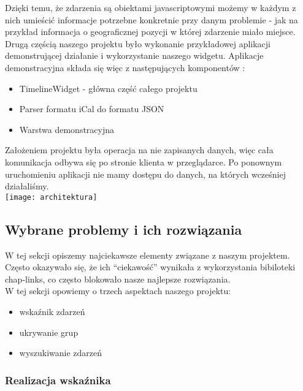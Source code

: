 \documentclass[polish,12pt]{aghthesis}
\begin{document}
Dzięki temu, że zdarzenia są obiektami javascriptowymi możemy w każdym z nich umieścić informacje potrzebne konkretnie przy danym problemie - jak na przykład informacja o geograficznej pozycji w której zdarzenie miało miejsce.\\

Drugą częścią naszego projektu było wykonanie przykładowej aplikacji demonstrującej działanie i wykorzystanie naszego widgetu. Aplikacje demonstracyjna składa się więc z 
następujących komponentów : 

\begin{itemize}
	\item TimelineWidget - główna część całego projektu
	\item Parser formatu iCal do formatu JSON
	\item Warstwa demonstracyjna
\end{itemize}

Założeniem projektu była operacja na nie zapisanych danych, więc cała komunikacja odbywa się po stronie klienta w przeglądarce. Po ponownym uruchomieniu aplikacji nie mamy dostępu do danych, na których wcześniej działaliśmy.
\\

\texttt{[image: architektura]}

\subsection{Wybrane problemy i ich rozwiązania}

W tej sekcji opiszemy najciekawsze elementy związane z naszym projektem. Często okazywało się, że ich “ciekawość” wynikała z wykorzystania bibiloteki chap-links, co często blokowało nasze najlepsze rozwiązania.\\

W tej sekcji opowiemy o trzech aspektach naszego projektu:
\begin{itemize}
	\item wskaźnik zdarzeń
	\item ukrywanie grup
	\item wyszukiwanie zdarzeń
\end{itemize}

\clearpage
\subsubsection{Realizacja wskaźnika}
\end{document}
